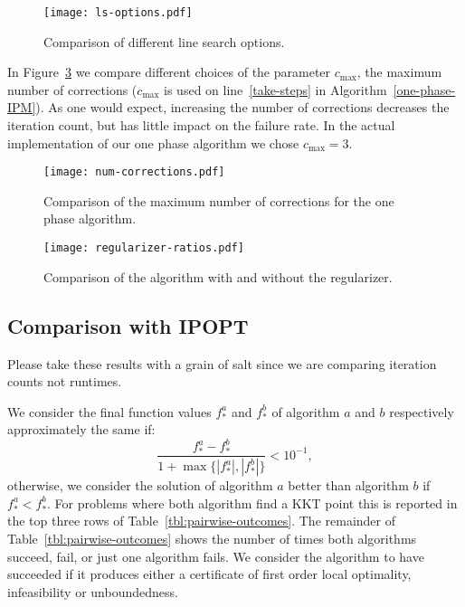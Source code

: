 \documentclass{article}
\begin{document}
\begin{figure}[H]
\texttt{[image: ls-options.pdf]}
\caption{Comparison of different line search options.}\label{fig:ls-options}
\end{figure}

In Figure~\ref{fig:num-corrections} we compare different choices of the parameter $c_{\max}$, the maximum number of corrections ($c_{\max}$ is used on line~\ref{take-steps} in Algorithm~\ref{one-phase-IPM}). As one would expect, increasing the number of corrections decreases the iteration count, but has little impact on the failure rate. In the actual implementation of our one phase algorithm we chose $c_{\max}=3$.

\begin{figure}[H]
\texttt{[image: num-corrections.pdf]}
\caption{Comparison of the maximum number of corrections for the one phase algorithm.}\label{fig:num-corrections}
\end{figure}


\begin{figure}[H]
\texttt{[image: regularizer-ratios.pdf]}
\caption{Comparison of the algorithm with and without the regularizer.}\label{fig:num-corrections}
\end{figure}


\subsection{Comparison with IPOPT}\label{alg:comparison-IPOPT}

Please take these results with a grain of salt since we are comparing iteration counts not runtimes.



We consider the final function values $f^{a}_{*}$ and $f^{b}_{*}$ of algorithm $a$ and $b$ respectively approximately the same if:
$$
\frac{f^{a}_{*} - f^{b}_{*}}{1 + \max \{ | f^{a}_{*} |, | f^{b}_{*} | \} } < 10^{-1},
$$
otherwise, we consider the solution of algorithm $a$ better than algorithm $b$ if $f^{a}_{*}  < f^{b}_{*}$. For problems where both algorithm find a KKT point this is reported in the top three rows of Table~\ref{tbl:pairwise-outcomes}. The remainder of Table~\ref{tbl:pairwise-outcomes} shows the number of times both algorithms succeed, fail, or just one algorithm fails. We consider the algorithm to have succeeded if it produces either a certificate of first order local optimality, infeasibility or unboundedness. 
\end{document}

